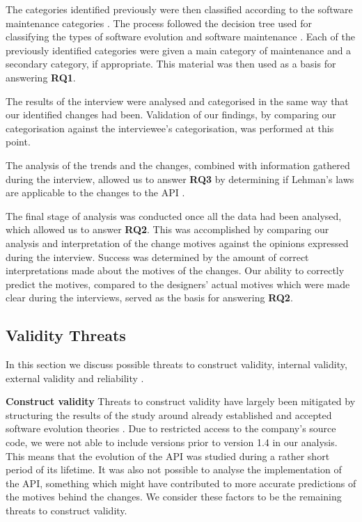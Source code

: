 \documentclass{sig-alternate}
\begin{document}
The categories identified previously were then classified according to the software maintenance categories \cite{chapin2001types}. The process followed the decision tree used for classifying the types of software evolution and software maintenance \cite{chapin2001types}. Each of the previously identified categories were given a main category of maintenance and a secondary category, if appropriate. This material was then used as a basis for answering \textbf{RQ1}.

The results of the interview were analysed and categorised in the same way that our identified changes had been. Validation of our findings, by comparing our categorisation against the interviewee's categorisation, was performed at this point. 

The analysis of the trends and the changes, combined with information gathered during the interview, allowed us to answer \textbf{RQ3} by determining if Lehman's laws are applicable to the changes to the API \cite{lehman1980programs}.

The final stage of analysis was conducted once all the data had been analysed, which allowed us to answer \textbf{RQ2}. This was accomplished by comparing our analysis and interpretation of the change motives against the opinions expressed during the interview. Success was determined by the amount of correct interpretations made about the motives of the changes. Our ability to correctly predict the motives, compared to the designers' actual motives which were made clear during the interviews, served as the basis for answering \textbf{RQ2}.


\subsection{Validity Threats} \label{validity_threats} %
In this section we discuss possible threats to construct validity, internal validity, external validity and reliability \cite{runeson2009guidelines}.

\smallskip \noindent
\textbf{Construct validity  } Threats to construct validity have largely been mitigated by structuring the results of the study around already established and accepted software evolution theories \cite{chapin2001types} \cite{lehman1980programs}. Due to restricted access to the company's source code, we were not able to include versions prior to version 1.4 in our analysis. This means that the evolution of the API was studied during a rather short period of its lifetime. It was also not possible to analyse the implementation of the API, something which might have contributed to more accurate predictions of the motives behind the changes. We consider these factors to be the remaining threats to construct validity. 
\end{document}
